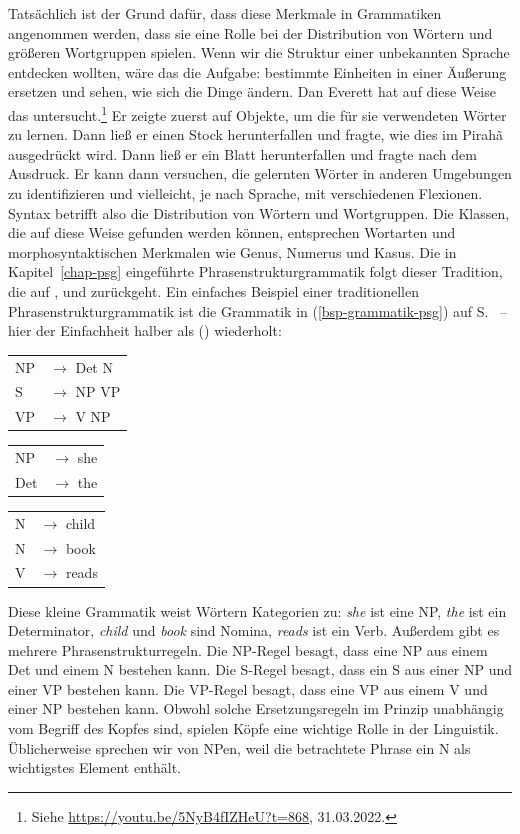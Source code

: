 Tatsächlich ist der Grund dafür, dass diese Merkmale in Grammatiken angenommen werden, dass sie eine Rolle
bei der Distribution von Wörtern und größeren Wortgruppen spielen. Wenn wir die Struktur einer
unbekannten Sprache entdecken wollten, wäre das die Aufgabe: bestimmte Einheiten in einer Äußerung ersetzen und sehen, wie sich die Dinge
ändern. Dan Everett hat auf diese Weise das  untersucht.\footnote{
Siehe \url{https://youtu.be/5NyB4fIZHeU?t=868}, 31.03.2022.
} Er zeigte zuerst auf Objekte, um die für sie verwendeten Wörter zu lernen. Dann ließ er einen Stock herunterfallen und fragte, wie dies
im Pirahã ausgedrückt wird. Dann ließ er ein Blatt herunterfallen und fragte nach dem Ausdruck. Er kann dann versuchen, die
gelernten Wörter in anderen Umgebungen zu identifizieren und vielleicht, je nach Sprache, mit verschiedenen Flexionen. Syntax
betrifft also die Distribution von Wörtern und Wortgruppen. Die Klassen, die auf diese Weise gefunden werden können,
entsprechen Wortarten und morphosyntaktischen Merkmalen wie Genus, Numerus und Kasus. Die
in Kapitel~\ref{chap-psg} eingeführte Phrasenstrukturgrammatik folgt dieser Tradition, die auf
\citet{Bloomfield26a}, \citet{Harris46a-u} und \citet{Wells47a} zurückgeht. Ein einfaches Beispiel einer
traditionellen Phrasenstrukturgrammatik ist die Grammatik in (\ref{bsp-grammatik-psg}) auf
S.~\pageref{bsp-grammatik-psg} -- hier der Einfachheit halber als ()
wiederholt:
\ea
\label{bsp-grammatik-psg-two}
\begin{tabular}[t]{@{}l@{ }l}
{NP} & {$\to$ Det N}\\          
{S}  & {$\to$ NP VP}\\
{VP} & {$\to$ V NP}
\end{tabular}\hspace{2cm}%
\begin{tabular}[t]{@{}l@{ }l}
{NP}  & {$\to$ she}\\
{Det} & {$\to$ the}\\
\end{tabular}\hspace{8mm}
\begin{tabular}[t]{@{}l@{ }l}
{N} & {$\to$ child}\\
{N} & {$\to$ book}\\
{V} & {$\to$ reads}\\
\end{tabular}
\z
Diese kleine Grammatik weist Wörtern Kategorien zu: \emph{she} ist eine NP, \emph{the} ist ein Determinator,
\emph{child} und \emph{book} sind Nomina, \emph{reads} ist ein Verb. Außerdem gibt es mehrere
Phrasenstrukturregeln. Die NP-Regel besagt, dass eine NP aus einem Det und einem N bestehen kann. Die S-Regel besagt,
dass ein S aus einer NP und einer VP bestehen kann. Die VP-Regel besagt, dass eine VP aus einem V und einer
NP bestehen kann. Obwohl solche Ersetzungsregeln im Prinzip unabhängig vom Begriff des Kopfes sind, spielen Köpfe eine
wichtige Rolle in der Linguistik. Üblicherweise sprechen wir von NPen, weil die betrachtete Phrase
ein N als wichtigstes Element enthält.

